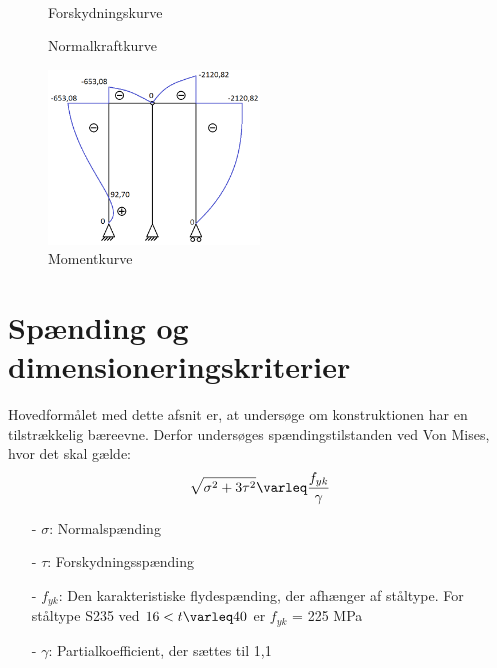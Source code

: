 \begin{figure}[H]
\begin{minipage}[b]{0.48\textwidth}
	\end{minipage}\\ %
	\begin{minipage}[t]{0.48\textwidth}
		\caption{Forskydningskurve} %
		\label{fig:forskydningskurve}
	\end{minipage}\hfill
	\begin{minipage}[t]{0.48\textwidth}
		\caption{Normalkraftkurve} %
		\label{fig:normalkraftkurve}
	\end{minipage}
\end{figure}

\begin{figure}[H]
	\centering
	\includegraphics[width=0.5\textwidth]{billeder/skkm.png}
	\caption{Momentkurve}
	\label{fig:momentkurve}
\end{figure}

\section{Spænding og dimensioneringskriterier}
Hovedformålet med dette afsnit er, at undersøge om konstruktionen har en tilstrækkelig bæreevne. Derfor undersøges spændingstilstanden ved Von Mises, hvor det skal gælde: 
\begin{equation}
	\sqrt{\sigma^2 + 3\tau^2} \varleq \frac{f_{yk}}{\gamma}
\end{equation}

\begin{itemize}
	\item[-] $\sigma$: Normalspænding 
	\item[-] $\tau$: Forskydningsspænding
	\item[-] $f_{yk}$: Den karakteristiske flydespænding, der afhænger af ståltype. For ståltype S235 ved $16 < t \varleq 40$ er $f_{yk}$ = 225 MPa \citep[ s. 213]{stabi}
	\item[-] $\gamma$: Partialkoefficient, der sættes til 1,1 \citep[ s. 212]{stabi}
\end{itemize}

